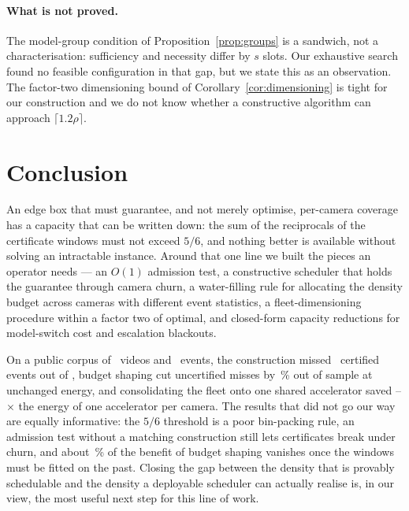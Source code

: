 \documentclass[preprint,review,12pt]{elsarticle}
\theoremstyle{definition}
\newcommand{\dens}{\rho}
\begin{document}
\paragraph{What is not proved.} The model-group condition of Proposition~\ref{prop:groups} is a
sandwich, not a characterisation: sufficiency and necessity differ by $s$ slots. Our exhaustive
search found no feasible configuration in that gap, but we state this as an observation. The
factor-two dimensioning bound of Corollary~\ref{cor:dimensioning} is tight for our construction
and we do not know whether a constructive algorithm can approach $\lceil 1.2\dens\rceil$.

\section{Conclusion}\label{sec:conclusion}

An edge box that must guarantee, and not merely optimise, per-camera coverage has a capacity that
can be written down: the sum of the reciprocals of the certificate windows must not exceed $5/6$,
and nothing better is available without solving an intractable instance. Around that one line we
built the pieces an operator needs --- an $O(1)$ admission test, a constructive scheduler that
holds the guarantee through camera churn, a water-filling rule for allocating the density budget
across cameras with different event statistics, a fleet-dimensioning procedure within a factor two
of optimal, and closed-form capacity reductions for model-switch cost and escalation blackouts.

On a public corpus of \numVideos\ videos and \numEvents\ events, the construction missed
\numEtwoCertMissed\ certified events out of \numEtwoCertTotal, budget shaping cut uncertified
misses by \numHoldoutGain\,\% out of sample at unchanged energy, and consolidating the fleet onto
one shared accelerator saved \numGainMin--\numGainMax$\times$ the energy of one accelerator per
camera. The results that did not go our way are equally informative: the $5/6$ threshold is a poor
bin-packing rule, an admission test without a matching construction still lets certificates break
under churn, and about \numOracleShare\,\% of the benefit of budget shaping vanishes once the
windows must be fitted on the past. Closing the gap between the density that is provably
schedulable and the density a deployable scheduler can actually realise is, in our view, the most
useful next step for this line of work.
\end{document}
